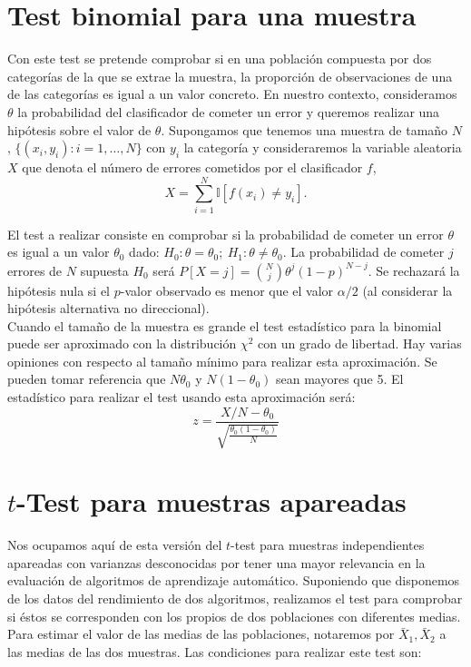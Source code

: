 \section{Test binomial para una muestra}

	Con este test se pretende comprobar si en una población
compuesta por dos categorías de la que se extrae la muestra, 
la proporción de observaciones de una de las categorías es 
igual a un valor concreto. En nuestro contexto, consideramos 
$\theta$ la probabilidad del clasificador de cometer un error 
y queremos realizar una hipótesis sobre el valor de $\theta$. 
Supongamos que tenemos una muestra de tamaño $N$, 
$\{(x_i, y_i): i = 1, \dots,N \}$ con $y_i$ la categoría y
consideraremos la variable aleatoria $X$ que denota el número
de errores cometidos por el clasificador $f$,
	\[ 
		X = \sum\limits_{i=1}^N 
				\mathbb{I}[f(x_i) \neq y_i].
	\]
	
	El test a realizar consiste en comprobar si la probabilidad de 
cometer un error $\theta$ es igual a un valor $\theta_0$
dado: $H_0: \theta = \theta_0;\ H_1: \theta \neq \theta_0$.
La probabilidad de cometer $j$ errores de $N$ supuesta $H_0$
será $P[X = j] = {N \choose j} \theta^j (1-p)^{N-j}$. Se 
rechazará la hipótesis nula si el $p$-valor observado 
es menor que el valor $\alpha/2$ (al considerar la hipótesis 
alternativa no direccional).\\
	Cuando el tamaño de la muestra es grande el test 
estadístico para la binomial puede ser aproximado con la 
distribución $\chi^2$ con un grado de libertad. Hay varias 
opiniones con respecto al tamaño mínimo para realizar
esta aproximación. Se pueden tomar referencia que 
$N \theta_0$ y $N (1 - \theta_0)$ sean mayores que 5. El 
estadístico para realizar el test usando esta 
aproximación será:
	\[
		z = \frac{X/N - \theta_0}
				{\sqrt{\frac{\theta_0(1 - \theta_0)}
							{N}}}
	\]
	
\section{$t$-Test para muestras apareadas}

	Nos ocupamos aquí de esta versión del $t$-test para 
muestras independientes apareadas con varianzas 
desconocidas por tener una mayor relevancia en la evaluación 
de algoritmos de aprendizaje automático. Suponiendo que 
disponemos de los datos del rendimiento de dos algoritmos, 
realizamos el test para comprobar si éstos se corresponden 
con los propios de dos poblaciones con diferentes medias. 
Para estimar el valor de las medias de las poblaciones, 
notaremos por $\bar{X}_1, \bar{X}_2$ a las medias de las dos 
muestras. Las condiciones para realizar este test son:
	
